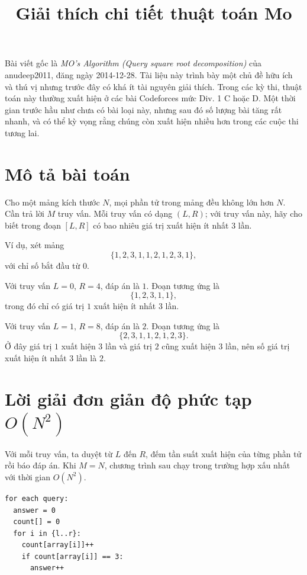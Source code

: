 \documentclass[11pt]{article}
\title{Giải thích chi tiết thuật toán Mo}
\author{}
\date{}
\begin{document}
\maketitle


Bài viết gốc là \textit{MO's Algorithm (Query square root decomposition)} của
anudeep2011, đăng ngày 2014-12-28. Tài liệu này trình bày một chủ đề hữu ích
và thú vị nhưng trước đây có khá ít tài nguyên giải thích. Trong các kỳ thi,
thuật toán này thường xuất hiện ở các bài Codeforces mức Div. 1 C hoặc D. Một
thời gian trước hầu như chưa có bài loại này, nhưng sau đó số lượng bài tăng
rất nhanh, và có thể kỳ vọng rằng chúng còn xuất hiện nhiều hơn trong các cuộc
thi tương lai.

\tableofcontents

\section{Mô tả bài toán}

Cho một mảng kích thước $N$, mọi phần tử trong mảng đều không lớn hơn $N$. Cần
trả lời $M$ truy vấn. Mỗi truy vấn có dạng $(L,R)$; với truy vấn này, hãy cho
biết trong đoạn $[L,R]$ có bao nhiêu giá trị xuất hiện ít nhất $3$ lần.

Ví dụ, xét mảng
\[
  \{1,2,3,1,1,2,1,2,3,1\},
\]
với chỉ số bắt đầu từ $0$.

Với truy vấn $L=0$, $R=4$, đáp án là $1$. Đoạn tương ứng là
\[
  \{1,2,3,1,1\},
\]
trong đó chỉ có giá trị $1$ xuất hiện ít nhất $3$ lần.

Với truy vấn $L=1$, $R=8$, đáp án là $2$. Đoạn tương ứng là
\[
  \{2,3,1,1,2,1,2,3\}.
\]
Ở đây giá trị $1$ xuất hiện $3$ lần và giá trị $2$ cũng xuất hiện $3$ lần, nên
số giá trị xuất hiện ít nhất $3$ lần là $2$.

\section{Lời giải đơn giản độ phức tạp \texorpdfstring{$O(N^2)$}{O(N2)}}

Với mỗi truy vấn, ta duyệt từ $L$ đến $R$, đếm tần suất xuất hiện của từng phần
tử rồi báo đáp án. Khi $M=N$, chương trình sau chạy trong trường hợp xấu nhất
với thời gian $O(N^2)$.

\begingroup
\small
\begin{verbatim}
for each query:
  answer = 0
  count[] = 0
  for i in {l..r}:
    count[array[i]]++
    if count[array[i]] == 3:
      answer++
\end{verbatim}
\endgroup
\end{document}
